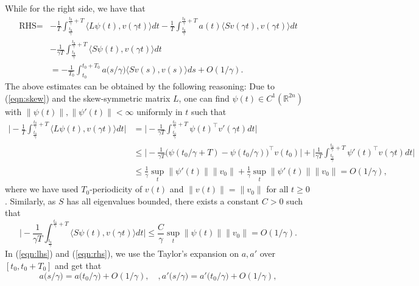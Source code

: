 \documentclass[11pt]{article}
\newcommand{\Rm}{{\mathbb R}}
\newcommand{\1}{\mathds{1}}
\begin{document}
While for the right side, we have that
\begin{equation}\label{eqn:rhs}
\begin{aligned}
   \text{RHS}=&- \frac{1}{T}\int_{\frac{t_0}{\gamma}}^{\frac{t_0}{\gamma}+T} \langle L\psi(t), v(\gamma t)\rangle dt  - \frac{1}{T}\int_{\frac{t_0}{\gamma}}^{\frac{t_0}{\gamma}+T}a(t)\langle S v(\gamma t), v(\gamma t)\rangle dt \\
   & - \frac{1}{\gamma T}\int_{\frac{t_0}{\gamma}}^{\frac{t_0}{\gamma}+T} \langle S \psi( t), v(\gamma t)\rangle dt\\
   &= - \frac{1}{T_0}\int_{t_0}^{t_0+T_0} a\big(s/\gamma\big)\langle S v(s), v(s)\rangle ds + O(1/\gamma).
   \end{aligned}
\end{equation}
The above estimates can be obtained by the following reasoning: Due to (\ref{eqn:skew}) and the skew-symmetric matrix $L$, one can find $\psi(t)\in C^1(\Rm^{2n})$ with $\|\psi(t)\|, \|\psi'(t)\|<\infty$ uniformly in $t$ such that 
\begin{equation*}
\begin{aligned}
  \Big|- \frac{1}{T}\int_{\frac{t_0}{\gamma}}^{\frac{t_0}{\gamma}+T} \langle L\psi(t), v(\gamma t)\rangle dt\Big|  &=\Big| -\frac{1}{\gamma T}  \int_{\frac{t_0}{\gamma}}^{\frac{t_0}{\gamma}+T}\psi(t)^\top  v'(\gamma t) dt \Big|\\
  & \leq \Big|-\frac{1}{\gamma T}\Big(\psi(t_0/\gamma+T)-\psi(t_0/\gamma)\Big)^\top v(t_0)\Big|+\Big|\frac{1}{\gamma T}  \int_{\frac{t_0}{\gamma}}^{\frac{t_0}{\gamma}+T}\psi'(t)^\top  v(\gamma t) dt\Big|\\
  & \leq \frac{1}{\gamma}\sup_t\|\psi'(t)\|\|v_0\|+ \frac{1}{\gamma}\sup_t \|\psi'(t)\|\|v_0\| = O(1/\gamma),
\end{aligned}
\end{equation*}
where we have used $T_0$-periodicity of $v(t)$ and
$\|v(t)\| = \|v_0\|$ for all $t\geq 0$. Similarly, as $S$ has all eigenvalues bounded, there exists a constant $C>0$ such  that
\begin{equation*}
    \Big|- \frac{1}{\gamma T}\int_{\frac{t_0}{\gamma}}^{\frac{t_0}{\gamma}+T} \langle S \psi( t), v(\gamma t)\rangle dt\Big|\leq \frac{C}{\gamma}\sup_t\|\psi(t)\|\|v_0\|  = O(1/\gamma).
\end{equation*}
In (\ref{eqn:lhs}) and (\ref{eqn:rhs}), we use the Taylor's expansion on $a, a'$ over $[t_0, t_0+T_0]$ and get that
\begin{equation}
  a\big(s/\gamma\big) = a\big(t_0/\gamma\big) + O(1/\gamma) ,
  \quad, a'\big(s/\gamma\big) = a'\big(t_0/\gamma\big) + O(1/\gamma), 
\end{equation}
\end{document}
